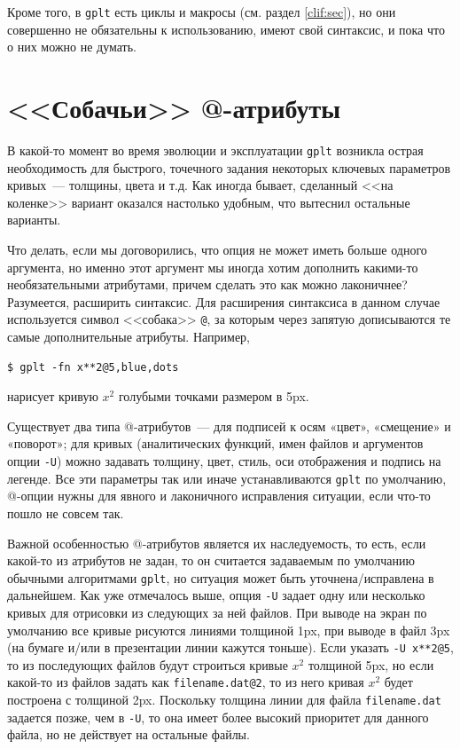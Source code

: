 \documentclass[12pt]{article}
\def\gplt{{\tt gplt}}
\begin{document}
Кроме того, в \gplt{} есть циклы и макросы (см. раздел \ref{clif:sec}), но они совершенно не обязательны к использованию, имеют свой синтаксис, и пока что
о них можно не думать.


\section{<<Собачьи>> @-атрибуты}\label{dog:attr:sec}
\begin{figure}
  \vphantom{.}
  \vspace{-2.5cm}

\end{figure}
В какой-то момент во время эволюции и эксплуатации \verb'gplt' возникла острая необходимость для быстрого, точечного задания некоторых ключевых
параметров кривых~--- толщины, цвета и т.д. Как иногда бывает, сделанный <<на коленке>> вариант
оказался настолько удобным, что вытеснил остальные варианты. 

Что делать, если мы договорились, что опция не может иметь больше одного аргумента, но именно этот аргумент мы иногда хотим дополнить какими-то необязательными атрибутами,
причем сделать это как можно лаконичнее?
Разумеется, расширить синтаксис. Для расширения синтаксиса в данном случае используется символ <<собака>> \verb'@', за которым через запятую дописываются те самые
дополнительные атрибуты. Например,
\begin{verbatim}
$ gplt -fn x**2@5,blue,dots
\end{verbatim}
нарисует кривую $x^2$ голубыми точками размером в 5px.

Существует два типа @-атрибутов~--- для подписей к осям «цвет», «смещение» и «поворот»; для кривых (аналитических функций,
имен файлов и аргументов опции \verb'-U') можно задавать толщину, цвет, стиль, оси отображения и подпись на легенде.
Все эти параметры так или иначе устанавливаются \gplt{} по умолчанию, @-опции нужны для явного и лаконичного исправления ситуации, если что-то пошло не совсем так. 

Важной особенностью @-атрибутов является их наследуемость, то есть, если какой-то из атрибутов не задан, то он считается задаваемым по умолчанию
обычными алгоритмами \gplt, но ситуация может быть уточнена/исправлена в дальнейшем.
Как уже отмечалось выше, опция \verb'-U' задает одну или несколько кривых для отрисовки из следующих за ней файлов. При выводе на экран по умолчанию
все кривые рисуются линиями толщиной 1px, при выводе в файл 3px (на бумаге и/или в презентации линии кажутся тоньше).
Если указать \verb'-U x**2@5', то из последующих файлов будут строиться кривые $x^2$ толщиной 5px, но если какой-то из файлов задать как
\verb'filename.dat@2', то из него кривая $x^2$ будет построена с толщиной 2px. Поскольку толщина линии для файла \verb'filename.dat' задается позже, чем в \verb'-U',
то она имеет более высокий приоритет для данного файла, но не действует на остальные файлы. 
\end{document}
